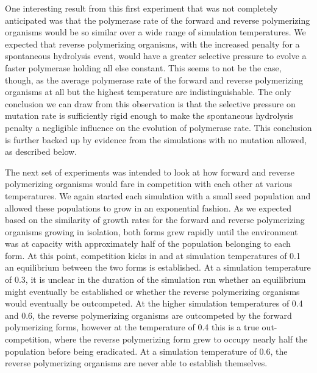 One interesting result from this first experiment that was not completely anticipated was that the polymerase rate of the forward and reverse polymerizing organisms would be so similar over a wide range of simulation temperatures. We expected that reverse polymerizing organisms, with the increased penalty for a spontaneous hydrolysis event, would have a greater selective pressure to evolve a faster polymerase holding all else constant. This seems to not be the case, though, as the average polymerase rate of the forward and reverse polymerizing organisms at all but the highest temperature are indistinguishable. The only conclusion we can draw from this observation is that the selective pressure on mutation rate is sufficiently rigid enough to make the spontaneous hydrolysis penalty a negligible influence on the evolution of polymerase rate. This conclusion is further backed up by evidence from the simulations with no mutation allowed, as described below.

The next set of experiments was intended to look at how forward and reverse polymerizing organisms would fare in competition with each other at various temperatures. We again started each simulation with a small seed population and allowed these populations to grow in an exponential fashion. As we expected based on the similarity of growth rates for the forward and reverse polymerizing organisms growing in isolation, both forms grew rapidly until the environment was at capacity with approximately half of the population belonging to each form. At this point, competition kicks in and at simulation temperatures of 0.1 an equilibrium between the two forms is established. At a simulation temperature of 0.3, it is unclear in the duration of the simulation run whether an equilibrium might eventually be established or whether the reverse polymerizing organisms would eventually be outcompeted. At the higher simulation temperatures of 0.4 and 0.6, the reverse polymerizing organisms are outcompeted by the forward polymerizing forms, however at the temperature of 0.4 this is a true out-competition, where the reverse polymerizing form grew to occupy nearly half the population before being eradicated. At a simulation temperature of 0.6, the reverse polymerizing organisms are never able to establish themselves.

